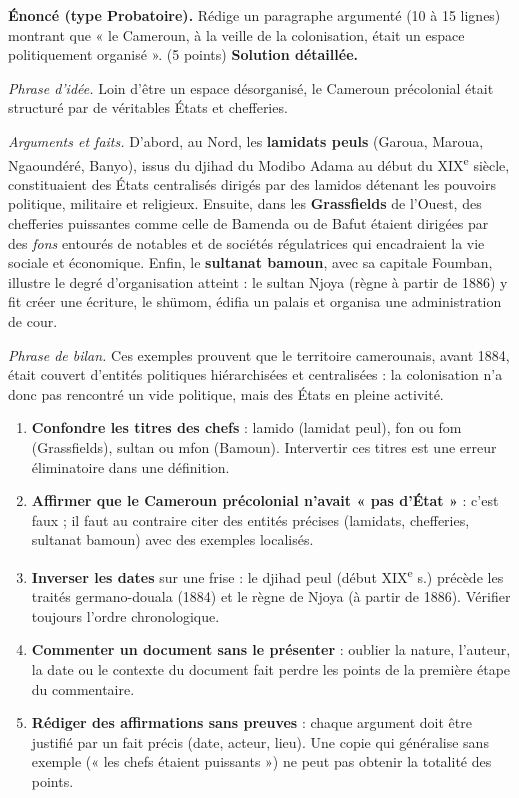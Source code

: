 \documentclass[11pt]{article}
\begin{document}
\begin{exoresolu}
\textbf{Énoncé (type Probatoire).} Rédige un paragraphe argumenté (10 à 15 lignes) montrant que « le Cameroun, à la veille de la colonisation, était un espace politiquement organisé ». (5 points)
\tcblower
\textbf{Solution détaillée.}

\emph{Phrase d'idée.} Loin d'être un espace désorganisé, le Cameroun précolonial était structuré par de véritables États et chefferies.

\emph{Arguments et faits.} D'abord, au Nord, les \textbf{lamidats peuls} (Garoua, Maroua, Ngaoundéré, Banyo), issus du djihad du Modibo Adama au début du XIX\textsuperscript{e} siècle, constituaient des États centralisés dirigés par des lamidos détenant les pouvoirs politique, militaire et religieux. Ensuite, dans les \textbf{Grassfields} de l'Ouest, des chefferies puissantes comme celle de Bamenda ou de Bafut étaient dirigées par des \emph{fons} entourés de notables et de sociétés régulatrices qui encadraient la vie sociale et économique. Enfin, le \textbf{sultanat bamoun}, avec sa capitale Foumban, illustre le degré d'organisation atteint : le sultan Njoya (règne à partir de 1886) y fit créer une écriture, le shümom, édifia un palais et organisa une administration de cour.

\emph{Phrase de bilan.} Ces exemples prouvent que le territoire camerounais, avant 1884, était couvert d'entités politiques hiérarchisées et centralisées : la colonisation n'a donc pas rencontré un vide politique, mais des États en pleine activité.
\end{exoresolu}

\begin{attention}
\begin{enumerate}
\item \textbf{Confondre les titres des chefs} : lamido (lamidat peul), fon ou fom (Grassfields), sultan ou mfon (Bamoun). Intervertir ces titres est une erreur éliminatoire dans une définition.
\item \textbf{Affirmer que le Cameroun précolonial n'avait « pas d'État »} : c'est faux ; il faut au contraire citer des entités précises (lamidats, chefferies, sultanat bamoun) avec des exemples localisés.
\item \textbf{Inverser les dates} sur une frise : le djihad peul (début XIX\textsuperscript{e} s.) précède les traités germano-douala (1884) et le règne de Njoya (à partir de 1886). Vérifier toujours l'ordre chronologique.
\item \textbf{Commenter un document sans le présenter} : oublier la nature, l'auteur, la date ou le contexte du document fait perdre les points de la première étape du commentaire.
\item \textbf{Rédiger des affirmations sans preuves} : chaque argument doit être justifié par un fait précis (date, acteur, lieu). Une copie qui généralise sans exemple (« les chefs étaient puissants ») ne peut pas obtenir la totalité des points.
\end{enumerate}
\end{attention}
\end{document}
